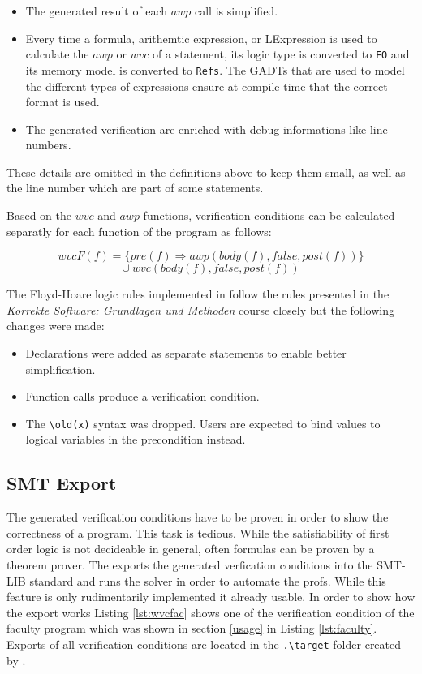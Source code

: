 \documentclass[12pt]{article}
\begin{document}
\begin{itemize}
    \item The generated result of each $awp$ call is simplified.
    \item Every time a formula, arithemtic expression, or LExpression is used to calculate the $awp$ or $wvc$ of a statement, its logic type is converted to \texttt{FO} and its memory model is converted to \texttt{Refs}.
    The GADTs that are used to model the different types of expressions ensure at compile time that the correct format is used.
    \item The generated verification are enriched with debug informations like line numbers.
\end{itemize}

These details are omitted in the definitions above to keep them small, as well as the line number which are part of some statements.

Based on the $wvc$ and $awp$ functions, verification conditions can be calculated separatly for each function of the program as follows:

\[wvcF(f) = \{pre(f)\Rightarrow awp(body(f), false, post(f))\} \]
\[\cup\ wvc(body(f), false, post(f))\]

The Floyd-Hoare logic rules implemented in \verifyc follow the rules presented in the 
\emph{Korrekte Software: Grundlagen und Methoden} course closely but the following changes were made:

\begin{itemize}
    \item Declarations were added as separate statements to enable better simplification.
    \item Function calls produce a verification condition.
    \item The \texttt{\textbackslash old(x)} syntax was dropped. Users are expected to bind values to logical variables in the precondition instead.
\end{itemize}

\subsection{SMT Export}
The generated verification conditions have to be proven in order to show the correctness of a program.
This task is tedious.
While the satisfiability of first order logic is not decideable in general, often formulas can be proven by a theorem prover.
The \verifyc exports the generated verfication conditions into the SMT-LIB standard and runs the \zthree solver in order to automate the profs.
While this feature is only rudimentarily implemented it already usable.
In order to show how the export works Listing \ref{lst:wvcfac} shows one of the verification condition of the faculty program which was shown in section \ref{usage} in Listing \ref{lst:faculty}.
Exports of all verification conditions are located in the \texttt{.\textbackslash target} folder created by \verifyc.
\end{document}
